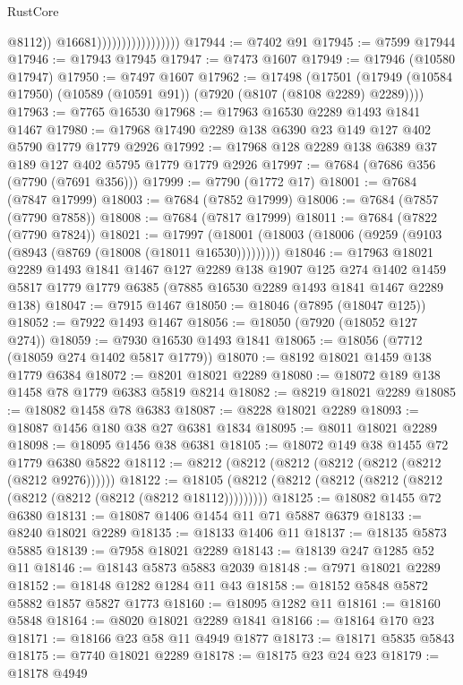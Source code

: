 \begin{lexlean}{RustCore}
\begin{coremodule}
                                          @8112))
                                      @16681)))))))))))))))))
@17944 := @7402 @91
@17945 := @7599 @17944
@17946 := @17943 @17945
@17947 := @7473 @1607
@17949 := @17946 (@10580 @17947)
@17950 := @7497 @1607
@17962 := @17498
    (@17501 (@17949 (@10584 @17950) (@10589 (@10591 @91)) (@7920 (@8107 (@8108 @2289) @2289))))
@17963 := @7765 @16530
@17968 := @17963 @16530 @2289 @1493 @1841 @1467
@17980 := @17968 @17490 @2289 @138 @6390 @23 @149 @127 @402 @5790 @1779 @1779 @2926
@17992 := @17968 @128 @2289 @138 @6389 @37 @189 @127 @402 @5795 @1779 @1779 @2926
@17997 := @7684 (@7686 @356 (@7790 (@7691 @356)))
@17999 := @7790 (@1772 @17)
@18001 := @7684 (@7847 @17999)
@18003 := @7684 (@7852 @17999)
@18006 := @7684 (@7857 (@7790 @7858))
@18008 := @7684 (@7817 @17999)
@18011 := @7684 (@7822 (@7790 @7824))
@18021 := @17997 (@18001 (@18003 (@18006 (@9259 (@9103 (@8943 (@8769 (@18008 (@18011 @16530)))))))))
@18046 := @17963
    @18021
    @2289
    @1493
    @1841
    @1467
    @127
    @2289
    @138
    @1907
    @125
    @274
    @1402
    @1459
    @5817
    @1779
    @1779
    @6385
    (@7885 @16530 @2289 @1493 @1841 @1467 @2289 @138)
@18047 := @7915 @1467
@18050 := @18046 (@7895 (@18047 @125))
@18052 := @7922 @1493 @1467
@18056 := @18050 (@7920 (@18052 @127 @274))
@18059 := @7930 @16530 @1493 @1841
@18065 := @18056 (@7712 (@18059 @274 @1402 @5817 @1779))
@18070 := @8192 @18021 @1459 @138 @1779 @6384
@18072 := @8201 @18021 @2289
@18080 := @18072 @189 @138 @1458 @78 @1779 @6383 @5819 @8214
@18082 := @8219 @18021 @2289
@18085 := @18082 @1458 @78 @6383
@18087 := @8228 @18021 @2289
@18093 := @18087 @1456 @180 @38 @27 @6381 @1834
@18095 := @8011 @18021 @2289
@18098 := @18095 @1456 @38 @6381
@18105 := @18072 @149 @38 @1455 @72 @1779 @6380 @5822
@18112 := @8212 (@8212 (@8212 (@8212 (@8212 (@8212 (@8212 @9276))))))
@18122 := @18105 (@8212 (@8212 (@8212 (@8212 (@8212 (@8212 (@8212 (@8212 (@8212 @18112)))))))))
@18125 := @18082 @1455 @72 @6380
@18131 := @18087 @1406 @1454 @11 @71 @5887 @6379
@18133 := @8240 @18021 @2289
@18135 := @18133 @1406 @11
@18137 := @18135 @5873 @5885
@18139 := @7958 @18021 @2289
@18143 := @18139 @247 @1285 @52 @11
@18146 := @18143 @5873 @5883 @2039
@18148 := @7971 @18021 @2289
@18152 := @18148 @1282 @1284 @11 @43
@18158 := @18152 @5848 @5872 @5882 @1857 @5827 @1773
@18160 := @18095 @1282 @11
@18161 := @18160 @5848
@18164 := @8020 @18021 @2289 @1841
@18166 := @18164 @170 @23
@18171 := @18166 @23 @58 @11 @4949 @1877
@18173 := @18171 @5835 @5843
@18175 := @7740 @18021 @2289
@18178 := @18175 @23 @24 @23
@18179 := @18178 @4949

\end{coremodule}
\end{lexlean}
